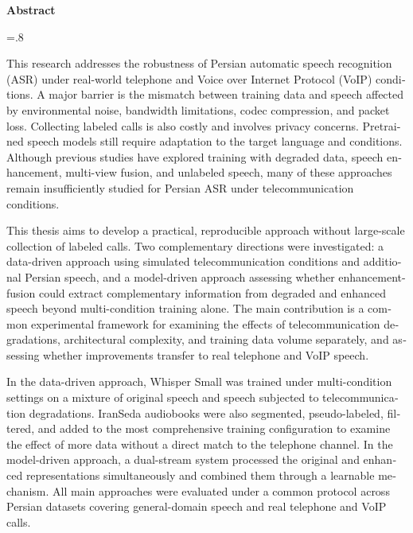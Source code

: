 
\begin{latin}

\begin{center}
\textbf{Abstract}
\end{center}
\baselineskip=.8\baselineskip

This research addresses the robustness of Persian automatic speech recognition (ASR) under real-world telephone and Voice over Internet Protocol (VoIP) conditions. A major barrier is the mismatch between training data and speech affected by environmental noise, bandwidth limitations, codec compression, and packet loss. Collecting labeled calls is also costly and involves privacy concerns. Pretrained speech models still require adaptation to the target language and conditions. Although previous studies have explored training with degraded data, speech enhancement, multi-view fusion, and unlabeled speech, many of these approaches remain insufficiently studied for Persian ASR under telecommunication conditions.

This thesis aims to develop a practical, reproducible approach without large-scale collection of labeled calls. Two complementary directions were investigated: a data-driven approach using simulated telecommunication conditions and additional Persian speech, and a model-driven approach assessing whether enhancement-fusion could extract complementary information from degraded and enhanced speech beyond multi-condition training alone. The main contribution is a common experimental framework for examining the effects of telecommunication degradations, architectural complexity, and training data volume separately, and assessing whether improvements transfer to real telephone and VoIP speech.

In the data-driven approach, Whisper Small was trained under multi-condition settings on a mixture of original speech and speech subjected to telecommunication degradations. IranSeda audiobooks were also segmented, pseudo-labeled, filtered, and added to the most comprehensive training configuration to examine the effect of more data without a direct match to the telephone channel. In the model-driven approach, a dual-stream system processed the original and enhanced representations simultaneously and combined them through a learnable mechanism. All main approaches were evaluated under a common protocol across Persian datasets covering general-domain speech and real telephone and VoIP calls.


\end{latin}

